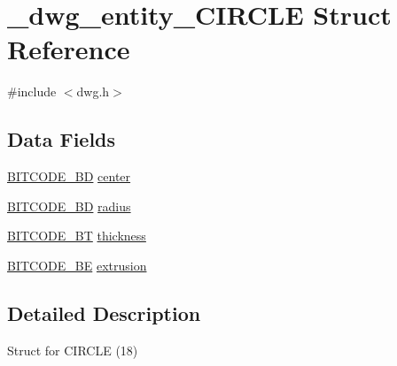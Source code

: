 \hypertarget{struct__dwg__entity__CIRCLE}{\section{\-\_\-dwg\-\_\-entity\-\_\-\-C\-I\-R\-C\-L\-E \-Struct \-Reference}
\label{struct__dwg__entity__CIRCLE}
}


{\ttfamily \#include $<$dwg.\-h$>$}

\subsection*{\-Data \-Fields}
\begin{DoxyCompactItemize}
\item 
\hyperlink{dwg_8h_a00698ef1bb072aa0a9360c6fc1c57587}{\-B\-I\-T\-C\-O\-D\-E\-\_\-B\-D} \hyperlink{struct__dwg__entity__CIRCLE_afbe912d9b0965a83ab9f1e24784a048c}{center}
\item 
\hyperlink{dwg_8h_a3c1e6781466b74ba07785d57da70ed97}{\-B\-I\-T\-C\-O\-D\-E\-\_\-\-B\-D} \hyperlink{struct__dwg__entity__CIRCLE_ad556f8403e68cd19c780af2469eebc2d}{radius}
\item 
\hyperlink{dwg_8h_afc93a5ddc38aeff965d4e93c71514495}{\-B\-I\-T\-C\-O\-D\-E\-\_\-\-B\-T} \hyperlink{struct__dwg__entity__CIRCLE_a2acecc76c1bdb2fbc04fcc11479b88e2}{thickness}
\item 
\hyperlink{dwg_8h_ac2622137c01aa3a719ec6c571d06ee6a}{\-B\-I\-T\-C\-O\-D\-E\-\_\-\-B\-E} \hyperlink{struct__dwg__entity__CIRCLE_a2acd1d0a857da7a82edd77850d4ca292}{extrusion}
\end{DoxyCompactItemize}


\subsection{\-Detailed \-Description}
\-Struct for \-C\-I\-R\-C\-L\-E (18) 


